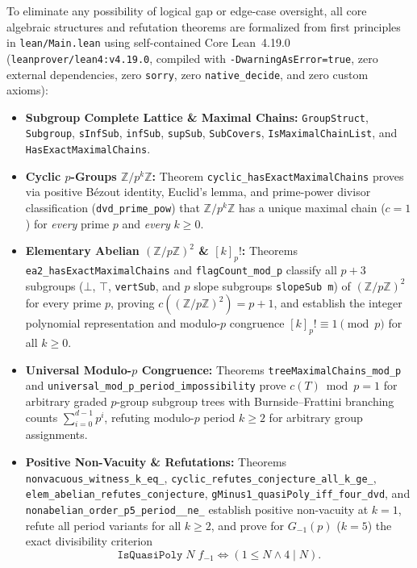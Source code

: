 \documentclass[11pt,a4paper]{article}
\theoremstyle{definition}
\begin{document}
To eliminate any possibility of logical gap or edge-case oversight, all core algebraic structures and refutation theorems are formalized from first principles in \texttt{lean/Main.lean} using self-contained Core Lean~4.19.0 (\texttt{leanprover/lean4:v4.19.0}, compiled with \texttt{-DwarningAsError=true}, zero external dependencies, zero \texttt{sorry}, zero \texttt{native\_decide}, and zero custom axioms):
\begin{itemize}\sloppy
  \item \textbf{Subgroup Complete Lattice \& Maximal Chains:} \texttt{GroupStruct}, \texttt{Subgroup}, \texttt{sInfSub}, \texttt{infSub}, \texttt{supSub}, \texttt{SubCovers}, \texttt{IsMaximal\allowbreak ChainList}, and \texttt{HasExact\allowbreak Maximal\allowbreak Chains}.
  \item \textbf{Cyclic $p$-Groups $\mathbb{Z}/p^k\mathbb{Z}$:} Theorem \texttt{cyclic\_\allowbreak hasExact\allowbreak Maximal\allowbreak Chains} proves via positive B\'ezout identity, Euclid's lemma, and prime-power divisor classification (\texttt{dvd\_\allowbreak prime\_\allowbreak pow}) that $\mathbb{Z}/p^k\mathbb{Z}$ has a unique maximal chain ($c = 1$) for \emph{every} prime $p$ and \emph{every} $k \ge 0$.
  \item \textbf{Elementary Abelian $(\mathbb{Z}/p\mathbb{Z})^2$ \& $[k]_p!$:} Theorems \texttt{ea2\_\allowbreak hasExact\allowbreak Maximal\allowbreak Chains} and \texttt{flagCount\_\allowbreak mod\_\allowbreak p} classify all $p + 3$ subgroups ($\bot$, $\top$, \texttt{vertSub}, and $p$ slope subgroups \texttt{slopeSub m}) of $(\mathbb{Z}/p\mathbb{Z})^2$ for every prime $p$, proving $c((\mathbb{Z}/p\mathbb{Z})^2) = p + 1$, and establish the integer polynomial representation and modulo-$p$ congruence $[k]_p! \equiv 1 \pmod p$ for all $k \ge 0$.
  \item \textbf{Universal Modulo-$p$ Congruence:} Theorems \texttt{tree\allowbreak Maximal\allowbreak Chains\_\allowbreak mod\_\allowbreak p} and \texttt{universal\_\allowbreak mod\_\allowbreak p\_\allowbreak period\_\allowbreak impos\allowbreak sibility} prove $c(T) \bmod p = 1$ for arbitrary graded $p$-group subgroup trees with Burnside--Frattini branching counts $\sum_{i=0}^{d-1} p^i$, refuting modulo-$p$ period $k \ge 2$ for arbitrary group assignments.
  \item \textbf{Positive Non-Vacuity \& Refutations:} Theorems \texttt{non\allowbreak vacuous\_\allowbreak witness\_\allowbreak k\_\allowbreak eq\_}, \texttt{cyclic\_\allowbreak refutes\_\allowbreak con\allowbreak jecture\_\allowbreak all\_\allowbreak k\_\allowbreak ge\_}, \texttt{elem\_\allowbreak abelian\_\allowbreak refutes\_\allowbreak con\allowbreak jecture}, \texttt{gMinus1\_\allowbreak quasi\allowbreak Poly\_\allowbreak iff\_\allowbreak four\_\allowbreak dvd}, and \texttt{non\allowbreak abelian\_\allowbreak order\_\allowbreak p5\_\allowbreak period\_\_\allowbreak ne\_} establish positive non-vacuity at $k = 1$, refute all period variants for all $k \ge 2$, and prove for $G_{-1}(p)$ ($k = 5$) the exact divisibility criterion
  \[
    \texttt{IsQuasiPoly}\; N\; f_{-1} \iff (1 \le N \land 4 \mid N).
  \]
\end{itemize}
\end{document}
